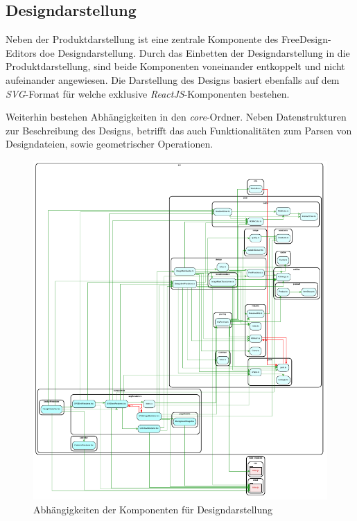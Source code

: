 
\subsection{Designdarstellung}
Neben der Produktdarstellung ist eine zentrale Komponente des FreeDesign-Editors doe Designdarstellung.
Durch das Einbetten der Designdarstellung in die Produktdarstellung, sind beide Komponenten voneinander entkoppelt und nicht aufeinander angewiesen. Die Darstellung des Designs basiert ebenfalls auf dem \emph{SVG}-Format für welche exklusive \emph{ReactJS}-Komponenten bestehen.

Weiterhin bestehen Abhängigkeiten in den \emph{core}-Ordner. Neben Datenstrukturen zur Beschreibung des Designs, betrifft das auch Funktionalitäten zum Parsen von Designdateien, sowie geometrischer Operationen. 


\begin{figure}[H]
    \centering
    \includegraphics{diagrams/Ist-Architektur/design-presenter-analysis.pdf}
    \caption{Abhängigkeiten der Komponenten für Designdarstellung}
    \label{fig:Designdarstellung}
\end{figure}
\begin{multicols}{2}

\end{multicols}